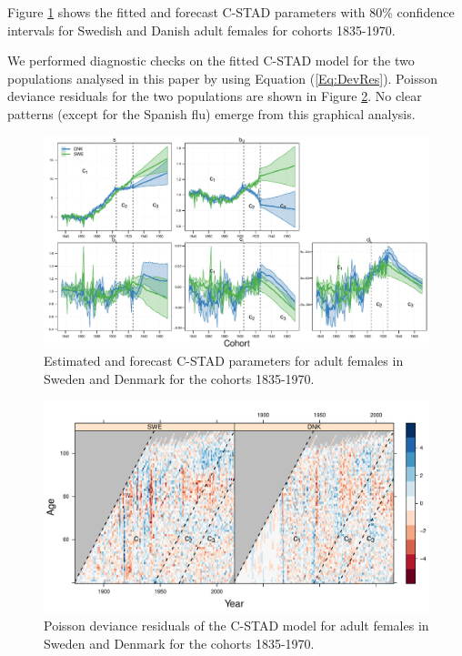 \documentclass[11pt, a4paper]{article}
\begin{document}
Figure \ref{Fig:CSTADparams} shows the fitted and forecast C-STAD parameters with 80\% confidence intervals for Swedish and Danish adult females for cohorts 1835-1970.

We performed diagnostic checks on the fitted C-STAD model for the two populations analysed in this paper by using Equation (\ref{Eq:DevRes}). Poisson deviance residuals for the two populations are shown in Figure \ref{Fig:CSTADresid}. No clear patterns (except for the Spanish flu) emerge from this graphical analysis.

\begin{landscape}
	\begin{figure}[h!]
		\begin{center}
			\includegraphics[scale=0.92]{./Figures/FA1.pdf} 
			\caption{Estimated and forecast C-STAD parameters for adult females in Sweden and Denmark for the cohorts 1835-1970.\label{Fig:CSTADparams}}    
		\end{center}
	\end{figure}
\end{landscape}
 
\begin{landscape}
	\begin{figure}[h!]
		\begin{center}
			\includegraphics[scale=0.92]{./Figures/FA2.pdf} 
			\caption{Poisson deviance residuals of the C-STAD model for adult females in Sweden and Denmark for the cohorts 1835-1970.\label{Fig:CSTADresid}}    
		\end{center}
	\end{figure}
\end{landscape}


 
\end{document}

